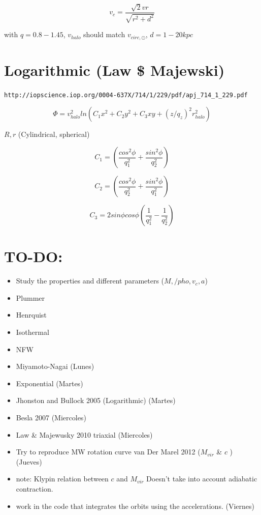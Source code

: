 \documentclass[a4paper, 12pt]{article} %
\begin{document}
\begin{equation}
v_c = \dfrac{\sqrt{2}vr}{\sqrt{r^2 + d^2}}
\end{equation}

with $q=0.8-1.45$, $v_{halo}$ should match $v_{circ, \odot}$, $d=1-20kpc$


\section{Logarithmic (Law \$ Majewski)}
\verb+http://iopscience.iop.org/0004-637X/714/1/229/pdf/apj_714_1_229.pdf+

\begin{equation}
\Phi = v^2_{halo} ln(C_1 x^2 + C_2y^2 + C_3 xy + (z/q_z)^2 r_{halo}^2)
\end{equation}

$R, r$ (Cylindrical, spherical)

\begin{equation}
C_1 = \left( \dfrac{cos^2 \phi}{q_1^2} + \dfrac{sin^2 \phi}{q_2^2}   \right)
\end{equation}

\begin{equation}
C_2 = \left( \dfrac{cos^2 \phi}{q_2^2} + \dfrac{sin^2 \phi}{q_1^2} \right)
\end{equation}

\begin{equation}
C_3 = 2 sin \phi cos\phi \left( \dfrac{1}{q_1^2} - \dfrac{1}{q_2^2} \right)
\end{equation}

\section{TO-DO:}

\begin{itemize}

\item Study the properties and different parameters ($M, /pho, v_c, a$)

\item Plummer
\item Henrquist
\item Isothermal
\item NFW
\item Miyamoto-Nagai (Lunes)
\item Exponential (Martes)
\item Jhonston and Bullock 2005 (Logarithmic) (Martes)
\item Besla 2007 (Miercoles)
\item Law \& Majewusky 2010 triaxial (Miercoles)

\item Try to reproduce MW rotation curve van Der Marel 2012 ($M_{vir}$ \& $c$ ) (Jueves)


\item note: Klypin relation between $c$ and $M_{vir}$ Doesn't take into 
account adiabatic contraction. 

\item work in the code that integrates the orbits using the accelerations. (Viernes)

\end{itemize}
\end{document}
